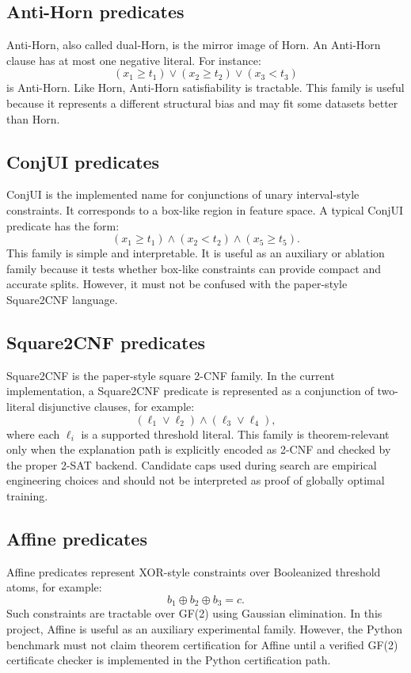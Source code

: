 \documentclass[11pt,a4paper]{article}
\begin{document}
\subsection{Anti-Horn predicates}

Anti-Horn, also called dual-Horn, is the mirror image of Horn. An Anti-Horn clause has at most one negative literal. For instance:
\[
    (x_1 \geq t_1) \lor (x_2 \geq t_2) \lor (x_3 < t_3)
\]
is Anti-Horn. Like Horn, Anti-Horn satisfiability is tractable. This family is useful because it represents a different structural bias and may fit some datasets better than Horn.

\subsection{ConjUI predicates}

ConjUI is the implemented name for conjunctions of unary interval-style constraints. It corresponds to a box-like region in feature space. A typical ConjUI predicate has the form:
\[
    (x_1 \geq t_1) \land (x_2 < t_2) \land (x_5 \geq t_5).
\]
This family is simple and interpretable. It is useful as an auxiliary or ablation family because it tests whether box-like constraints can provide compact and accurate splits. However, it must not be confused with the paper-style Square2CNF language.

\subsection{Square2CNF predicates}

Square2CNF is the paper-style square 2-CNF family. In the current implementation, a Square2CNF predicate is represented as a conjunction of two-literal disjunctive clauses, for example:
\[
    (\ell_1 \lor \ell_2) \land (\ell_3 \lor \ell_4),
\]
where each $\ell_i$ is a supported threshold literal. This family is theorem-relevant only when the explanation path is explicitly encoded as 2-CNF and checked by the proper 2-SAT backend. Candidate caps used during search are empirical engineering choices and should not be interpreted as proof of globally optimal training.

\subsection{Affine predicates}

Affine predicates represent XOR-style constraints over Booleanized threshold atoms, for example:
\[
    b_1 \oplus b_2 \oplus b_3 = c.
\]
Such constraints are tractable over GF(2) using Gaussian elimination. In this project, Affine is useful as an auxiliary experimental family. However, the Python benchmark must not claim theorem certification for Affine until a verified GF(2) certificate checker is implemented in the Python certification path.
\end{document}
